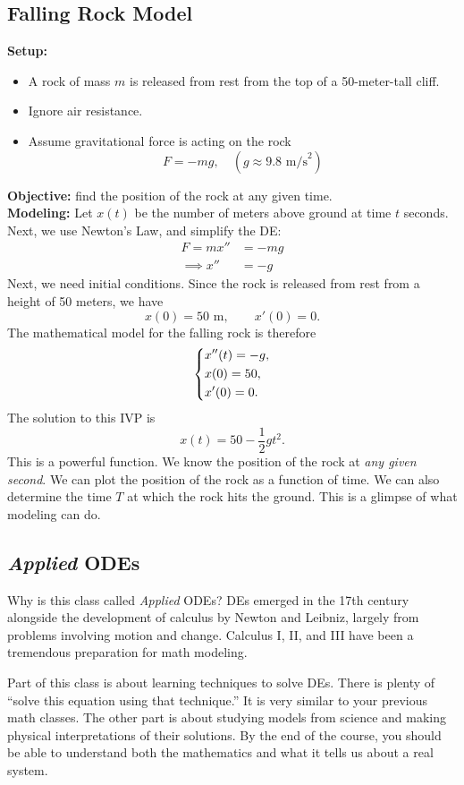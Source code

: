 \documentclass[11pt,letterpaper]{article}
\begin{document}
\subsection{Falling Rock Model}
\textbf{Setup:}
\begin{itemize}
    \item A rock of mass $m$ is released from rest from the top of a 50-meter-tall cliff.
    \item Ignore air resistance. 
    \item Assume gravitational force is acting on the rock 
\[
F=-mg, \quad (g\approx 9.8 \text{ m/s}^2)
\]
\end{itemize}
\textbf{Objective:} find the position of the rock at any given time.\\
\textbf{Modeling:} Let $x(t)$ be the number of meters above ground at time $t$ seconds. Next, we use Newton's Law, and simplify the DE:
\begin{align*}    
F = mx''&=-mg\\ 
\implies x'' &=-g
\end{align*}
Next, we need initial conditions. Since the rock is released from rest from a height of 50 meters, we have
\[
x(0)=50 \text{ m},
\qquad
x'(0)=0.
\]
The mathematical model for the falling rock is therefore
\[
\begin{dcases}
x''(t)=-g,\\
x(0)=50,\\
x'(0)=0.
\end{dcases}
\]
The solution to this IVP is 
\[
x(t) = 50 - \frac{1}{2}gt^2.
\]
This is a powerful function. We know the position of the rock at \textit{any given second}. We can plot the position of the rock as a function of time. We can also determine the time $T$ at which the rock hits the ground. This is a glimpse of what modeling can do.


\subsection{\textit{Applied} ODEs}

Why is this class called \textit{Applied} ODEs? DEs emerged in the 17th century alongside the development of calculus by Newton and Leibniz, largely from problems involving motion and change. Calculus I, II, and III have been a tremendous preparation for math modeling. 

Part of this class is about learning techniques to solve DEs. There is plenty of ``solve this equation using that technique.'' It is very similar to your previous math classes. The other part is about studying models from science and making physical interpretations of their solutions. By the end of the course, you should be able to understand both the mathematics and what it tells us about a real system.
\end{document}
